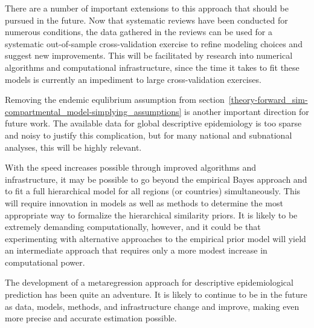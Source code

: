There are a number of important extensions to this approach that
should be pursued in the future.  Now that systematic reviews have
been conducted for numerous conditions, the data gathered in the
reviews can be used for a systematic out-of-sample cross-validation
exercise to refine modeling choices and suggest new improvements.
This will be facilitated by research into numerical algorithms and
computational infrastructure, since the time it takes to fit these
models is currently an impediment to large cross-validation exercises.

Removing the endemic equlibrium assumption from
section~\ref{theory-forward_sim-compartmental_model-simplying_assumptions}
is another important direction for future work.  The available data
for global descriptive epidemiology is too sparse and noisy to justify
this complication, but for many national and subnational analyses,
this will be highly relevant.

With the speed increases possible through improved algorithms and
infrastructure, it may be possible to go beyond the empirical Bayes
approach and to fit a full hierarchical model for all regions (or
countries) simultaneously.  This will require innovation in models as
well as methods to determine the most appropriate way to formalize the
hierarchical similarity priors.  It is likely to be extremely
demanding computationally, however, and it could be that experimenting
with alternative approaches to the empirical prior model will yield an
intermediate approach that requires only a more modest increase in
computational power.





The development of a metaregression approach for descriptive
epidemiological prediction has been quite an adventure.  It is likely
to continue to be in the future as data, models, methods, and
infrastructure change and improve, making even more precise and
accurate estimation possible.